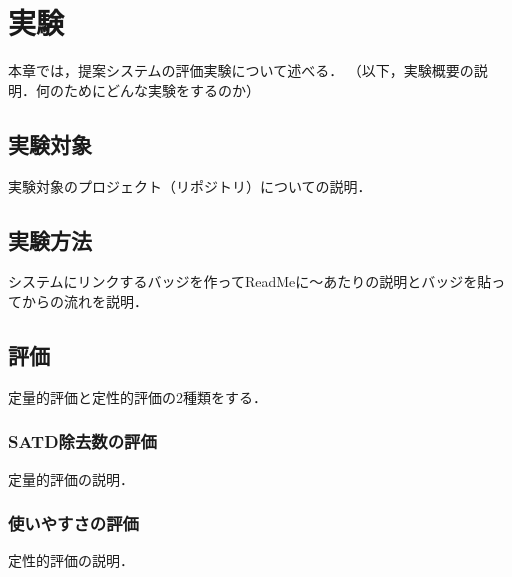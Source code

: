 \chapter{実験}
本章では，提案システムの評価実験について述べる．
（以下，実験概要の説明．何のためにどんな実験をするのか）

\section{実験対象}
実験対象のプロジェクト（リポジトリ）についての説明．

\section{実験方法}
システムにリンクするバッジを作ってReadMeに～あたりの説明とバッジを貼ってからの流れを説明．

\section{評価}
定量的評価と定性的評価の2種類をする．

\subsection{SATD除去数の評価}
定量的評価の説明．

\subsection{使いやすさの評価}
定性的評価の説明．
